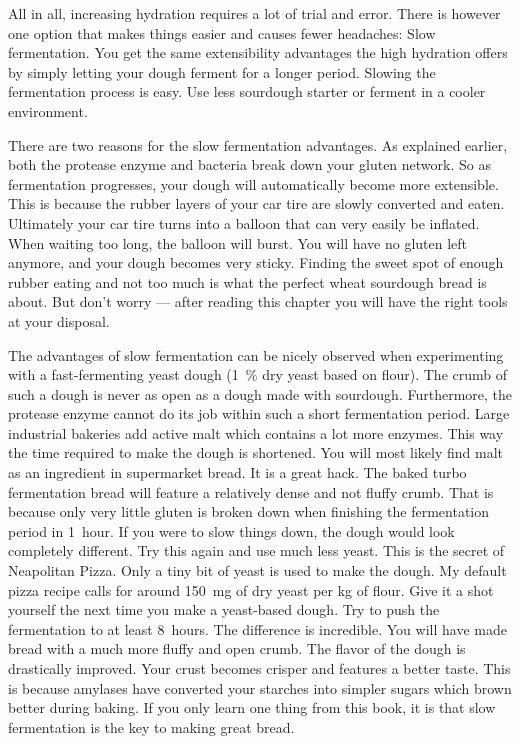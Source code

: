 All in all, increasing hydration requires a lot of trial and error. There
is however one option that makes things easier and causes fewer headaches:
Slow fermentation. You get the same extensibility advantages the high hydration
offers by simply letting your dough ferment for a longer period.
Slowing the fermentation process is easy. Use less
sourdough starter or ferment in a cooler environment.

There are two reasons for the slow fermentation advantages.
As explained earlier, both the protease enzyme and bacteria break down your
gluten network. So as fermentation progresses, your dough will automatically
become more extensible. This is because the rubber layers of your car tire
are slowly converted and eaten. Ultimately your car tire turns into a balloon
that can very easily be inflated. When waiting too long, the
balloon will burst. You will have no gluten left anymore, and your dough
becomes very sticky. Finding the sweet spot of enough rubber eating and not
too much is what the perfect wheat sourdough bread is about. But don't worry --- after reading
this chapter you will have the right tools at your disposal.

The advantages of slow fermentation can be nicely observed when experimenting
with a fast-fermenting yeast dough (\qty{1}{\percent} dry yeast based on flour). The
crumb of such a dough is never as
open as a dough made with sourdough. Furthermore, the protease enzyme
cannot do its job within such a short fermentation period.
Large industrial bakeries add active malt which contains a
lot more enzymes. This way the time required to make the dough is shortened. You
will most likely find malt as an ingredient in supermarket bread. It is a
great hack. The baked turbo fermentation bread will feature a relatively dense
and not fluffy crumb. That is because only very little gluten is broken down when
finishing the fermentation period in 1~hour. If you were to slow things down,
the dough would look completely different.
Try this again and use much less yeast. This is the
secret of Neapolitan Pizza. Only a tiny bit of yeast is used to make the
dough. My default pizza recipe calls for around \qty{150}{\mg} of dry
yeast per \unit{\kg} of flour. Give it a shot yourself the next time you
make a yeast-based dough. Try to push the fermentation to at least 8~hours.
The difference is incredible. You will have made bread with a much more
fluffy and open crumb. The flavor of the dough is drastically improved. Your
crust becomes crisper and features a better taste. This is because amylases have
converted your starches into simpler sugars which brown better during baking.
If you only learn one thing from this book, it is that slow fermentation is
the key to making great bread.

